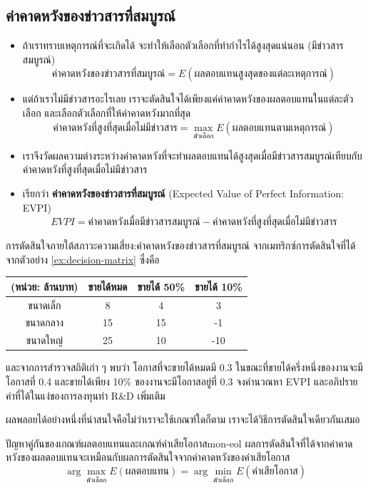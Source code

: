 \subsection{ค่าคาดหวังของข่าวสารที่สมบูรณ์}
\begin{itemize}
    \item ถ้าเราทราบเหตุการณ์ที่จะเกิดได้ จะทำให้เลือกตัวเลือกที่ทำกำไรได้สูงสุดแน่นอน (มีข่าวสารสมบูรณ์)
    $$
    \text{ค่าคาดหวังของข่าวสารที่สมบูรณ์} = E(\text{ผลตอบแทนสูงสุดของแต่ละเหตุการณ์})
    $$
    \item แต่ถ้าเราไม่มีข่าวสารอะไรเลย เราจะตัดสินใจได้เพียงแค่ค่าคาดหวังของผลตอบแทนในแต่ละตัวเลือก และเลือกตัวเลือกที่ให้ค่าคาดหวังมากที่สุด
    $$
    \text{ค่าคาดหวังที่สูงที่สุดเมื่อไม่มีข่าวสาร} = \max_\text{ตัวเลือก}E(\text{ผลตอบแทนตามเหตุการณ์})
    $$
    \item เราจึงวัดผลความต่างระหว่างค่าคาดหวังที่จะทำผลตอบแทนได้สูงสุดเมื่อมีข่าวสารสมบูรณ์เทียบกับค่าคาดหวังที่สูงที่สุดเมื่อไม่มีข่าวสาร
    \item เรียกว่า \textbf{ค่าคาดหวังของข่าวสารที่สมบูรณ์} (Expected Value of Perfect Information: EVPI)
    $$
    EVPI = \text{ค่าคาดหวังเมื่อมีข่าวสารสมบูรณ์} - \text{ค่าคาดหวังที่สูงที่สุดเมื่อไม่มีข่าวสาร}
    $$
\end{itemize}
\begin{example}
    {การตัดสินใจภายใต้สภาวะความเสี่ยง:ค่าคาดหวังของข่าวสารที่สมบูรณ์}{}
    จากเมทริกซ์การตัดสินใจที่ได้จากตัวอย่าง \ref{ex:decision-matrix} ซึ่งคือ
    \begin{center}
        \begin{tabular}{|c|c|c|c|}
        \hline
            (หน่วย: ล้านบาท) & ขายได้หมด & ขายได้ 50\% & ขายได้ 10\% \\ \hline
            ขนาดเล็ก & 8 & 4 & 3 \\
            ขนาดกลาง & 15 & 15 & -1\\
            ขนาดใหญ่ & 25 & 10 & -10\\ \hline
        \end{tabular}
    \end{center}
    และจากการสำรวจสถิติเก่า ๆ พบว่า โอกาสที่จะขายได้หมดมี 0.3 ในขณะที่ขายได้ครึ่งหนึ่งของงานจะมีโอกาสที่ 0.4 และขายได้เพียง 10\% ของงานจะมีโอกาสอยู่ที่ 0.3 จงคำนวณหา EVPI และอภิปรายค่าที่ได้ในแง่ของการลงทุนทำ R\&D เพิ่มเติม 
\end{example}
\newpage
ผลพลอยได้อย่างหนึ่งที่น่าสนใจคือไม่ว่าเราจะใช้เกณฑ์ใดก็ตาม เราจะได้วิธีการตัดสินใจเดียวกันเสมอ
\begin{theorem}
    {ปัญหาคู่กันของเกณฑ์ผลตอบแทนและเกณฑ์ค่าเสียโอกาส}{mon-eol}
    ผลการตัดสินใจที่ได้จากค่าคาดหวังของผลตอบแทนจะเหมือนกับผลการตัดสินใจจากค่าคาดหวังของค่าเสียโอกาส
    $$
    \arg\max_{\text{ตัวเลือก}} E(\text{ผลตอบแทน}) = \arg\min_{\text{ตัวเลือก}} E(\text{ค่าเสียโอกาส})
    $$
\end{theorem}

